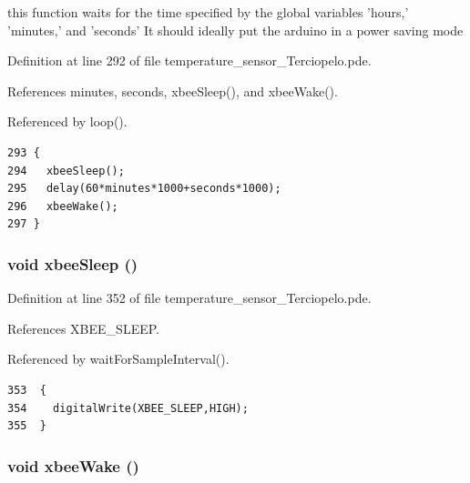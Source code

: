 this function waits for the time specified by the global variables 'hours,' 'minutes,' and 'seconds' It should ideally put the arduino in a power saving mode 



Definition at line 292 of file temperature\_\-sensor\_\-Terciopelo.pde.

References minutes, seconds, xbeeSleep(), and xbeeWake().

Referenced by loop().

\begin{Code}\begin{verbatim}293 {
294   xbeeSleep();
295   delay(60*minutes*1000+seconds*1000);
296   xbeeWake();
297 }
\end{verbatim}
\end{Code}


\hypertarget{temperature__sensor___terciopelo_8pde_a06edc5122b70b3231ff87d8234fe759}{
\subsubsection[{xbeeSleep}]{\setlength{\rightskip}{0pt plus 5cm}void xbeeSleep ()}}
\label{temperature__sensor___terciopelo_8pde_a06edc5122b70b3231ff87d8234fe759}




Definition at line 352 of file temperature\_\-sensor\_\-Terciopelo.pde.

References XBEE\_\-SLEEP.

Referenced by waitForSampleInterval().

\begin{Code}\begin{verbatim}353  {
354    digitalWrite(XBEE_SLEEP,HIGH);
355  }
\end{verbatim}
\end{Code}


\hypertarget{temperature__sensor___terciopelo_8pde_884c5dd8e3bb500063c819db197db666}{
\subsubsection[{xbeeWake}]{\setlength{\rightskip}{0pt plus 5cm}void xbeeWake ()}}
\label{temperature__sensor___terciopelo_8pde_884c5dd8e3bb500063c819db197db666}




